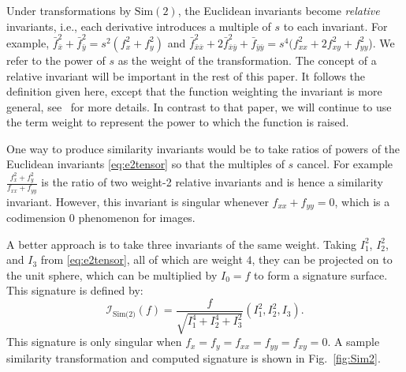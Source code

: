 \documentclass[review,onefignum,onetabnum]{siamonline190516}
\begin{document}
Under transformations by $\text{Sim}(2)$, the Euclidean invariants become
\emph{relative} invariants, i.e., each derivative introduces a multiple of $s$ to
each invariant. For example, $\bar{f}_{\bar x}^2 + \bar{f}_{\bar y}^2 =
s^2(f_x^2 + f_y^2)$ and $\bar{f}_{\bar x \bar x}^2 + 2\bar{f}_{\bar x \bar
y}^2 + \bar{f}_{\bar y \bar y} = s^4 (f_{xx}^2 + 2f_{xy}^2 + f_{yy}^2$). We
refer to the power of $s$ as the weight of the transformation. The concept of a 
relative invariant will be important in the rest of this paper. It follows the 
definition given here, except that the function weighting the invariant is more 
general, see~\citet{Fels1997} for more details. In contrast to that paper, 
we will continue to use the term weight to represent the power to which the function is raised.

One way to produce similarity invariants would be to take ratios of powers
of the Euclidean invariants \eqref{eq:e2tensor} so that the multiples of
$s$ cancel. For example $\frac{f_x^2 + f_y^2}{f_{xx} + f_{yy}}$ is the
ratio of two weight-2 relative invariants and is hence a similarity
invariant. However, this invariant is singular whenever $f_{xx} + f_{yy} =
0$, which is a codimension 0 phenomenon for images.

A better approach is to take three invariants of the same weight.
Taking $I_1^2$, $I_2^2$, and $I_3$ from \eqref{eq:e2tensor}, all of which are
weight $4$, they can be projected on to the unit sphere, which can be
multiplied by $I_0 = f$ to form a signature surface. This signature is
defined by:
\begin{equation}
    \label{eq:sim2signature}
\mathcal{I}_{\text{Sim(2)}}(f) = \frac{f}{\sqrt{I_1^4 + I_2^4 + I_3^2}}(I_1^2, I_2^2,
        I_3) .
\end{equation}
This signature is only singular when $f_x = f_y = f_{xx} = f_{yy} = f_{xy}
= 0$. A sample similarity transformation and computed signature is shown in
Fig.~\ref{fig:Sim2}.
\end{document}
